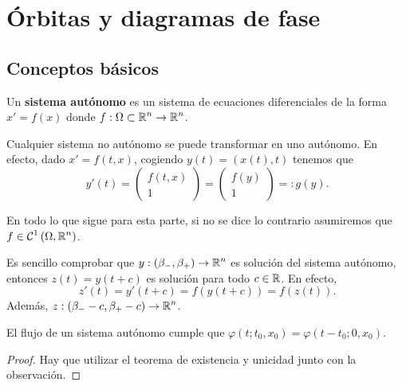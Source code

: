 \chapter{Órbitas y diagramas de fase}
\section{Conceptos básicos}
\begin{definition}
Un \textbf{sistema autónomo} es un sistema de ecuaciones diferenciales de la forma $\displaystyle x' = f\left(x\right) $ donde $\displaystyle f : \Omega \subset \mathbb{R}^{n}\to \mathbb{R}^{n} $.
\end{definition}
\begin{observation}
Cualquier sistema no autónomo se puede transformar en uno autónomo. En efecto, dado $\displaystyle x' = f\left(t,x\right) $, cogiendo $\displaystyle y\left(t\right)=\left(x\left(t\right), t\right) $ tenemos que 
\[y'\left(t\right)=\begin{pmatrix} f\left(t,x\right) \\ 1 \end{pmatrix}=\begin{pmatrix} f\left(y\right) \\ 1 \end{pmatrix} = : g\left(y\right) .\]
\end{observation}
\begin{notation}
En todo lo que sigue para esta parte, si no se dice lo contrario asumiremos que $\displaystyle f\in \mathcal{C}^{1}\left(\Omega , \mathbb{R}^{n}\right) $. 
\end{notation}
\begin{observation}
Es sencillo comprobar que $\displaystyle y: \left(\beta_{-}, \beta_{+ }\right)\to \mathbb{R}^{n} $ es solución del sistema autónomo, entonces $\displaystyle z\left(t\right)=y\left(t + c\right) $ es solución para todo $\displaystyle c \in \mathbb{R} $. En efecto, 
\[z'\left(t\right)=y'\left(t + c\right)=f\left(y\left(t + c\right)\right) = f\left(z\left(t\right)\right) .\]
Además, $\displaystyle z : \left(\beta_{-}-c, \beta_{+}-c\right)\to \mathbb{R}^{n} $. 
\end{observation}
\begin{prop}
El flujo de un sistema autónomo cumple que $\displaystyle \varphi\left(t; t_{0}, x_{0}\right)=\varphi\left(t-t_{0}; 0, x_{0}\right) $. 
\end{prop}
\begin{proof}
Hay que utilizar el teorema de existencia y unicidad junto con la observación. 
\end{proof}
